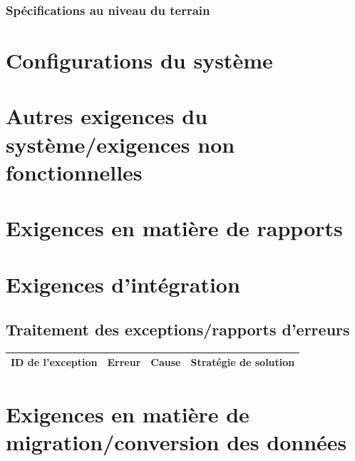 \documentclass[a4paper,12pt]{report}  %
\begin{document}
	\subsubsection{Spécifications au niveau du terrain}
	\lipsum[17]
	
	\pagebreak
	
	\section{Configurations du système}
	\lipsum[18]
	
	\section{Autres exigences du système/exigences non fonctionnelles}
	\lipsum[19]
	
	\section{Exigences en matière de rapports}
	\lipsum[20]
	
	\section{Exigences d'intégration}
	\lipsum[21]
	
	\subsection{Traitement des exceptions/rapports d'erreurs}
	\lipsum[22]
	
	\begin{longtable}{|l|l|l|l|}
		\hline
		\textbf{ID de l'exception} & \textbf{Erreur} & \textbf{Cause} & \textbf{Stratégie de solution} \\
		\hline
	\end{longtable}
	
	\section{Exigences en matière de migration/conversion des données}
	\lipsum[23]
	
\end{document}
